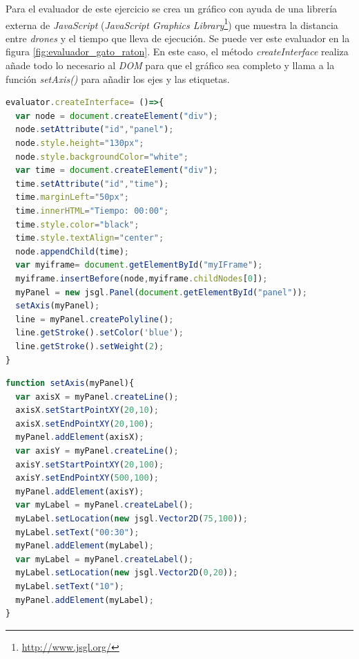   
Para el evaluador de este ejercicio se crea un gráfico con ayuda de una librería externa de \textit{JavaScript} (\textit{JavaScript Graphics Library}\footnote{\url{http://www.jsgl.org/}}) que muestra la distancia entre \textit{drones} y el tiempo que lleva de ejecución. Se puede ver este evaluador en la figura \ref{fig:evaluador_gato_raton}. 
 En este caso, el método \textit{createInterface} realiza añade todo lo necesario al \textit{DOM} para que el gráfico sea completo y llama a la función \textit{setAxis()} para añadir los ejes y las etiquetas.
 \begin{lstlisting}[language=javascript,caption=Función que establece los ejes y etiquetas de la gráfica]
 evaluator.createInterface= ()=>{
  var node = document.createElement("div");
  node.setAttribute("id","panel");
  node.style.height="130px";
  node.style.backgroundColor="white";
  var time = document.createElement("div");
  time.setAttribute("id","time");
  time.marginLeft="50px";
  time.innerHTML="Tiempo: 00:00";
  time.style.color="black";
  time.style.textAlign="center";
  node.appendChild(time);
  var myiframe= document.getElementById("myIFrame");
  myiframe.insertBefore(node,myiframe.childNodes[0]);
  myPanel = new jsgl.Panel(document.getElementById("panel"));
  setAxis(myPanel);
  line = myPanel.createPolyline();
  line.getStroke().setColor('blue');
  line.getStroke().setWeight(2);
}
\end{lstlisting}

\begin{lstlisting}[language=javascript,caption=Método \textit{createInterface}]
function setAxis(myPanel){
  var axisX = myPanel.createLine();
  axisX.setStartPointXY(20,10);
  axisX.setEndPointXY(20,100);
  myPanel.addElement(axisX);
  var axisY = myPanel.createLine();
  axisY.setStartPointXY(20,100);
  axisY.setEndPointXY(500,100);
  myPanel.addElement(axisY);
  var myLabel = myPanel.createLabel();
  myLabel.setLocation(new jsgl.Vector2D(75,100));
  myLabel.setText("00:30");
  myPanel.addElement(myLabel);
  var myLabel = myPanel.createLabel();
  myLabel.setLocation(new jsgl.Vector2D(0,20));
  myLabel.setText("10");
  myPanel.addElement(myLabel);
}
\end{lstlisting}

